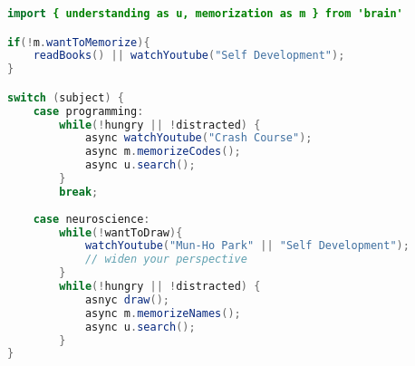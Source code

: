 \begin{lstlisting}[breaklines=true, 
    basicstyle=\small, 
    language=java, 
    showstringspaces=false]
import { understanding as u, memorization as m } from 'brain'

if(!m.wantToMemorize){
    readBooks() || watchYoutube("Self Development");
}

switch (subject) {
    case programming:
        while(!hungry || !distracted) {
            async watchYoutube("Crash Course");
            async m.memorizeCodes();
            async u.search();
        }
        break;
    
    case neuroscience:
        while(!wantToDraw){
            watchYoutube("Mun-Ho Park" || "Self Development"); 
            // widen your perspective
        }
        while(!hungry || !distracted) {
            asnyc draw();
            async m.memorizeNames();
            async u.search();
        }
}
\end{lstlisting}
\newpage